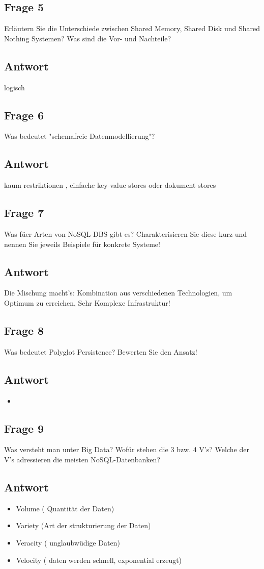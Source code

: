 \subsection*{Frage 5}
Erläutern Sie die Unterschiede zwischen Shared Memory, Shared Disk und Shared Nothing Systemen? Was sind die Vor- und Nachteile?
\subsection*{Antwort}
logisch

\subsection*{Frage 6}
Was bedeutet "schemafreie Datenmodellierung"?
\subsection*{Antwort}
kaum restriktionen , einfache key-value stores oder dokument stores

\subsection*{Frage 7}
Was füer Arten von NoSQL-DBS gibt es? Charakterisieren Sie diese kurz und nennen Sie jeweils Beispiele für konkrete Systeme!
\subsection*{Antwort}
Die Mischung macht's: Kombination aus verschiedenen Technologien, um Optimum zu erreichen, 
Sehr Komplexe Infrastruktur!

\subsection*{Frage 8}
Was bedeutet Polyglot Persistence? Bewerten Sie den Ansatz!
\subsection*{Antwort}
\begin{itemize}
	\item 
\end{itemize}

\subsection*{Frage 9}
Was versteht man unter Big Data? Wofür stehen die 3 bzw. 4 V's? Welche der V's adressieren die meisten NoSQL-Datenbanken?
\subsection*{Antwort}
\begin{itemize}
	\item Volume ( Quantität der Daten)
	\item Variety (Art der strukturierung der Daten)
	\item Veracity ( unglaubwüdige Daten)
	\item Velocity ( daten werden schnell, exponential erzeugt)
	
\end{itemize}
